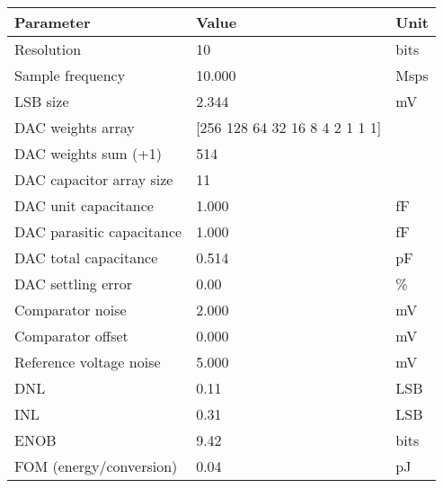 \begin{tabular}{lll}
\toprule
Parameter & Value & Unit \\
\midrule
Resolution & 10 & bits \\
Sample frequency & 10.000 & Msps \\
LSB size & 2.344 & mV \\
DAC weights array & [256 128  64  32  16   8   4   2   1   1   1] &  \\
DAC weights sum (+1) & 514 &  \\
DAC capacitor array size & 11 &  \\
DAC unit capacitance & 1.000 & fF \\
DAC parasitic capacitance & 1.000 & fF \\
DAC total capacitance & 0.514 & pF \\
DAC settling error & 0.00 & \% \\
Comparator noise & 2.000 & mV \\
Comparator offset & 0.000 & mV \\
Reference voltage noise & 5.000 & mV \\
DNL & 0.11 & LSB \\
INL & 0.31 & LSB \\
ENOB & 9.42 & bits \\
FOM (energy/conversion) & 0.04 & pJ \\
\bottomrule
\end{tabular}
